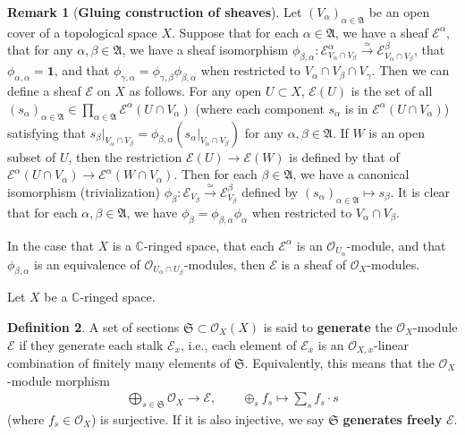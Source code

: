 \documentclass[12pt,b5paper,notitlepage]{report}
\theoremstyle{definition}
\newtheorem{df}{Definition}[section]
\newtheorem{rem}[df]{Remark}
\theoremstyle{plain}
\newcommand{\fk}{\mathfrak}
\newcommand{\id}{\mathbf{1}}
\newcommand{\scr}{\mathscr}
\newcommand{\Cbb}{\mathbb C}
\numberwithin{equation}{section}
\begin{document}
\begin{rem}[\textbf{Gluing construction of sheaves}]\label{lb12}
Let $(V_\alpha)_{\alpha\in\fk A}$ be an open cover of a topological space $X$. Suppose that for each $\alpha\in\fk A$, we have a sheaf $\scr E^\alpha$, that for any $\alpha,\beta\in\fk A$, we have a sheaf isomorphism $\phi_{\beta,\alpha}:\scr E^\alpha_{V_\alpha\cap V_\beta}\xrightarrow{\simeq}\scr E^\beta_{V_\alpha\cap V_\beta}$, that $\phi_{\alpha,\alpha}=\id$, and that $\phi_{\gamma,\alpha}=\phi_{\gamma,\beta}\phi_{\beta,\alpha}$ when restricted to $V_\alpha\cap V_\beta\cap V_\gamma$. Then we can define a sheaf $\scr E$ on $X$ as follows. For any open $U\subset X$, $\scr E(U)$ is the set of all $(s_\alpha)_{\alpha\in\fk A}\in\prod_{\alpha\in\fk A}\scr E^\alpha(U\cap V_\alpha)$ (where each component $s_\alpha$ is in $\scr E^\alpha(U\cap V_\alpha)$) satisfying that $s_\beta|_{V_\alpha\cap V_\beta}=\phi_{\beta,\alpha}(s_\alpha|_{V_\alpha\cap V_\beta})$ for any $\alpha,\beta\in\fk A$. If $W$ is an open subset of $U$, then the restriction $\scr E(U)\rightarrow\scr E(W)$ is defined by that of $\scr E^\alpha(U\cap V_\alpha)\rightarrow \scr E^\alpha(W\cap V_\alpha)$. Then for each $\beta\in\fk A$, we have a canonical isomorphism (trivialization) $\phi_\beta:\scr E_{V_\beta}\xrightarrow{\simeq} \scr E^\beta_{V_\beta}$ defined by $(s_\alpha)_{\alpha\in\fk A}\mapsto s_\beta$. It is clear that for each $\alpha,\beta\in\fk A$, we have $\phi_\beta=\phi_{\beta,\alpha}\phi_\alpha$ when restricted to $V_\alpha\cap V_\beta$.

In the case that $X$ is a $\Cbb$-ringed space, that each $\scr E^\alpha$ is an $\scr O_{U_\alpha}$-module, and that $\phi_{\beta,\alpha}$ is an equivalence of $\scr O_{U_\alpha\cap U_\beta}$-modules, then $\scr E$ is a sheaf of $\scr O_X$-modules. \hfill\qedsymbol
\end{rem}







Let $X$ be a $\Cbb$-ringed space.
\begin{df}
A set of sections $\fk S\subset\scr O_X(X)$ is said to \textbf{generate} the $\scr O_X$-module $\scr E$ if they generate each stalk $\scr E_x$, i.e., each element of $\scr E_x$ is an $\scr O_{X,x}$-linear combination of finitely many elements of $\fk S$. Equivalently, this means that the $\scr O_X$-module morphism
\begin{align}
\bigoplus_{s\in\fk S}\scr O_X\rightarrow\scr E,\qquad \oplus_s f_s\mapsto \sum_s f_s\cdot s 
\end{align}
(where $f_s\in \scr O_X$) is surjective. If it is also injective, we say $\fk S$ \textbf{generates freely} $\scr E$.
\end{df}
\end{document}

